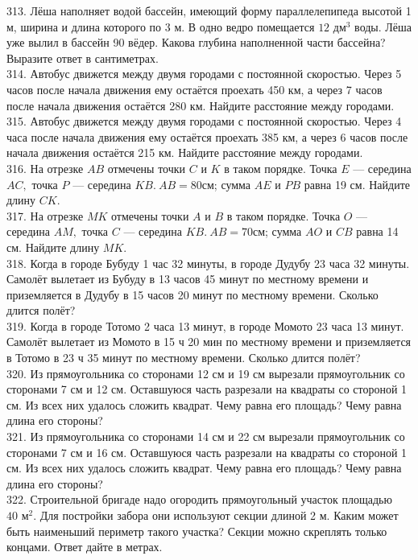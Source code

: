313. Лёша наполняет водой бассейн, имеющий форму параллелепипеда высотой 1 м, ширина и длина которого по 3 м. В одно ведро помещается $12\text{ дм}^3$ воды. Лёша уже вылил в бассейн 90 вёдер. Какова глубина наполненной части бассейна? Выразите ответ в сантиметрах.\\
314. Автобус движется между двумя городами с постоянной скоростью. Через 5 часов после начала движения ему остаётся проехать 450 км, а через 7 часов после начала движения остаётся 280 км. Найдите расстояние между городами.\\
315. Автобус движется между двумя городами с постоянной скоростью. Через 4 часа после начала движения ему остаётся проехать 385 км, а через 6 часов после начала движения остаётся 215 км. Найдите расстояние между городами.\\
316. На отрезке $AB$ отмечены точки $C$ и $K$ в таком порядке. Точка $E$ --- середина $AC,$ точка $P$ --- середина $KB.\ AB = 80$см; сумма $AE$ и $PB$ равна 19 см. Найдите длину $CK.$\\
317. На отрезке $MK$ отмечены точки $A$ и $B$ в таком порядке. Точка $O$ --- середина $AM,$ точка $C$ --- середина $KB.\ AB = 70$см; сумма $AO$ и $CB$ равна 14 см. Найдите длину $MK.$\\
318. Когда в городе Бубуду 1 час 32 минуты, в городе Дудубу 23 часа 32 минуты. Самолёт вылетает из Бубуду в 13 часов 45 минут по местному времени и приземляется в
Дудубу в 15 часов 20 минут по местному времени. Сколько длится полёт?\\
319. Когда в городе Тотомо 2 часа 13 минут, в городе Момото 23 часа 13 минут. Самолёт вылетает из Момото в 15 ч 20 мин по местному времени и приземляется в Тотомо в
23 ч 35 минут по местному времени. Сколько длится полёт?\\
320. Из прямоугольника со сторонами 12 см и 19 см вырезали прямоугольник со сторонами 7 см и 12 см. Оставшуюся часть разрезали на квадраты со стороной 1 см. Из всех них удалось сложить квадрат. Чему равна его площадь? Чему равна длина его стороны?\\
321. Из прямоугольника со сторонами 14 см и 22 см вырезали прямоугольник со сторонами
7 см и 16 см. Оставшуюся часть разрезали на квадраты со стороной 1 см. Из всех них удалось сложить квадрат. Чему равна его площадь? Чему равна длина его стороны?\\
322. Строительной бригаде надо огородить прямоугольный участок площадью $40\text{ м}^2.$ Для постройки забора они используют секции длиной 2 м. Каким может быть
наименьший периметр такого участка? Секции можно скреплять только концами. Ответ дайте в метрах.\\
